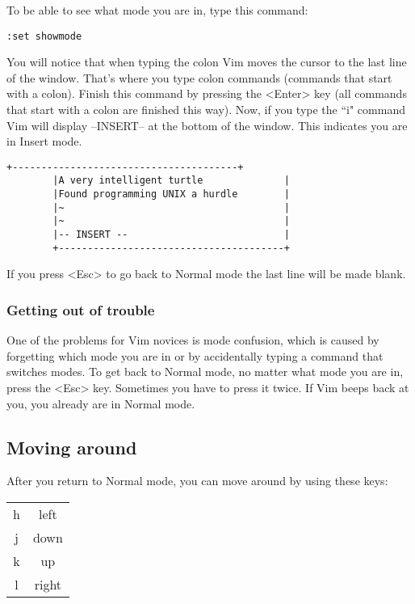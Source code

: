 To be able to see what mode you are in, type this command:

 \begin{Verbatim}[samepage=true]
 :set showmode
 \end{Verbatim}

You will notice that when typing the colon Vim moves the cursor to the last line of the window.
That's where you type colon commands (commands that start with a colon).
Finish this command by pressing the <Enter> key (all commands that start with a colon are finished this way).
Now, if you type the ``i" command Vim will display --INSERT-- at the bottom of the window.
This indicates you are in Insert mode.

		\begin{Verbatim}[samepage=true]
		+---------------------------------------+
		|A very intelligent turtle              |
		|Found programming UNIX a hurdle        |
		|~                                      |
		|~                                      |
		|-- INSERT --                           |
		+---------------------------------------+
		\end{Verbatim}

If you press <Esc> to go back to Normal mode the last line will be made blank.

\subsubsection{Getting out of trouble}

One of the problems for Vim novices is mode confusion, which is caused by forgetting which mode you are in or by accidentally typing a command that switches modes.
To get back to Normal mode, no matter what mode you are in, press the <Esc> key.
Sometimes you have to press it twice.
If Vim beeps back at you, you already are in Normal mode.

\subsection{Moving around}

After you return to Normal mode, you can move around by using these keys:
\label{hjlk}
\begin{center}
				\begin{tabular}{c|c} 
								h & left\\
								j & down\\
								k & up\\
								l & right
				\end{tabular}
\end{center}

